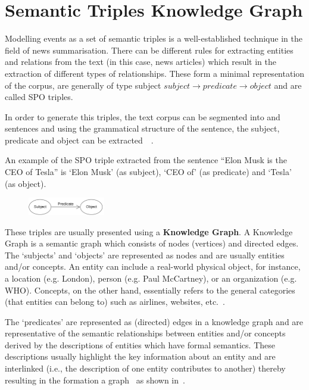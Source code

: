 \section{Semantic Triples Knowledge Graph}  \label{Knowledge_graph}

Modelling events as a set of semantic triples is a well-established technique in the field of news summarisation. There can be different rules for extracting entities and relations from the text (in this case, news articles) which result in the extraction of different types of relationships. These form a minimal representation of the corpus, are generally of type subject $subject \rightarrow predicate \rightarrow object$ and are called SPO triples.

In order to generate this triples, the text corpus can be segmented into and sentences and using the grammatical structure of the sentence, the subject, predicate and object can be extracted~\cite{retrospective_kg}~\cite{world2014rdf}.

An example of the SPO triple extracted from the sentence ``Elon Musk is the CEO of Tesla'' is `Elon Musk' (as subject), `CEO of' (as predicate) and `Tesla' (as object).

\begin{figure}[H]
    \centering
    \includegraphics[width=0.3\textwidth]{images/spo.png}
\end{figure}

These triples are usually presented using a \textbf{Knowledge Graph}. A Knowledge Graph is a semantic graph which consists of nodes (vertices) and directed edges. The `subjects' and `objects' are represented as nodes and are usually entities and/or concepts. An entity can include a real-world physical object, for instance, a location (e.g. London), person (e.g. Paul McCartney), or an organization (e.g. WHO). Concepts, on the other hand, essentially refers to the general categories (that entities can belong to) such as airlines, websites, etc.~\cite{retrospective_kg}.

The `predicates' are represented as (directed) edges in a knowledge graph and are representative of the semantic relationships between entities and/or concepts derived by the descriptions of entities which have formal semantics. These descriptions usually highlight the key information about an entity and are interlinked (i.e., the description of one entity contributes to another) thereby resulting in the formation a graph~\cite{retrospective_kg} as shown in~.

